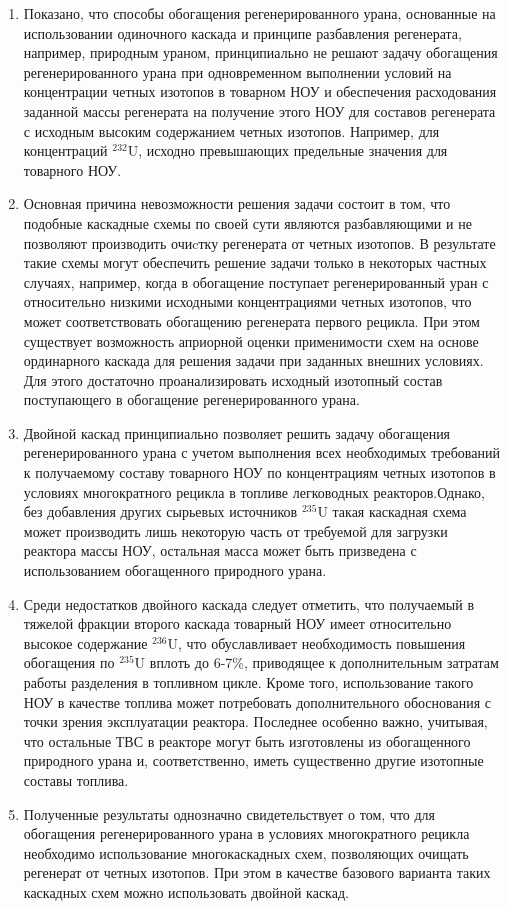 \begin{enumerate}
  \item Показано, что способы обогащения регенерированного урана, основанные на использовании одиночного каскада и принципе разбавления регенерата, например, природным ураном, принципиально не решают задачу обогащения регенерированного урана при одновременном выполнении условий на концентрации четных изотопов в товарном НОУ и обеспечения расходования заданной массы регенерата на получение этого НОУ для составов регенерата с исходным высоким содержанием четных изотопов. Например, для концентраций $^{232}$U, исходно превышающих предельные значения для товарного НОУ. 
  \item Основная причина невозможности решения задачи состоит в том, что подобные каскадные схемы по своей сути являются разбавляющими и не позволяют производить очиcтку регенерата от четных изотопов. В результате такие схемы могут обеспечить решение задачи только в некоторых частных случаях, например, когда в обогащение поступает регенерированный уран с относительно низкими исходными концентрациями четных изотопов, что может соответствовать обогащению регенерата первого рецикла. При этом существует возможность априорной оценки применимости схем на основе ординарного каскада для решения задачи при заданных внешних условиях. Для этого достаточно проанализировать исходный изотопный состав поступающего в обогащение регенерированного урана.
      \item Двойной каскад принципиально позволяет решить задачу обогащения регенерированного урана с учетом выполнения всех необходимых требований к получаемому составу товарного НОУ по концентрациям четных изотопов в условиях многократного рецикла в топливе легководных реакторов.Однако, без добавления других сырьевых источников $^{235}$U такая каскадная схема может производить лишь некоторую часть от требуемой для загрузки реактора массы НОУ, остальная масса может быть призведена с использованием обогащенного природного урана.
    \item Среди недостатков двойного каскада следует отметить, что получаемый в тяжелой фракции второго каскада товарный НОУ имеет относительно высокое содержание $^{236}$U, что обуславливает необходимость повышения обогащения по $^{235}$U вплоть до 6-7\%, приводящее к дополнительным затратам работы разделения в топливном цикле. Кроме того, использование такого НОУ в качестве топлива может потребовать дополнительного обоснования с точки зрения эксплуатации реактора. Последнее особенно важно, учитывая, что остальные ТВС в реакторе могут быть изготовлены из обогащенного природного урана и, соответственно, иметь существенно другие изотопные составы топлива.
  \item Полученные результаты однозначно свидетельствует о том, что для обогащения регенерированного урана в условиях многократного рецикла необходимо использование многокаскадных схем, позволяющих очищать регенерат от четных изотопов. При этом в качестве базового варианта таких каскадных схем можно использовать двойной каскад.
\end{enumerate}


\clearpage
